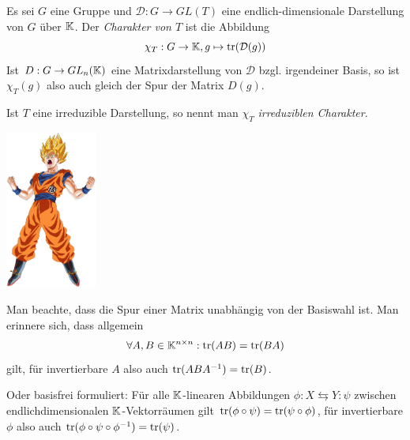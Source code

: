 \begin{minipage}{11cm}
\begin{definition}[Charaktere]
Es sei $G$ eine Gruppe und $\mathcal{D}: G\to GL(T)$ eine endlich-dimensionale Darstellung von $G$ über $\mathbb{K}$. Der \emph{Charakter von $T$} ist die Abbildung
\[\chi_T: G\to \mathbb{K}, g\mapsto \operatorname{tr}(\mathcal{D}(g))\]
Ist $D: G\to GL_n(\mathbb{K})$ eine Matrixdarstellung von $\mathcal{D}$ bzgl. irgendeiner Basis, so ist $\chi_T(g)$ also auch gleich der Spur der Matrix $D(g)$.

Ist $T$ eine irreduzible Darstellung, so nennt man $\chi_T$ \emph{irreduziblen Charakter}.
\end{definition}
\end{minipage}\hfill
\begin{minipage}{3cm}
\setlength{\baselineskip}{7pt}
\includegraphics[width=3cm]{pictures/levelup2.png}
\end{minipage}

\begin{remark}
Man beachte, dass die Spur einer Matrix unabhängig von der Basiswahl ist. Man erinnere sich, dass allgemein
\[\forall A,B\in \mathbb{K}^{n\times n}: \operatorname{tr}(AB) = \operatorname{tr}(BA)\]
gilt, für invertierbare $A$ also auch $\operatorname{tr}(ABA^{-1}) = \operatorname{tr}(B)$.

Oder basisfrei formuliert: Für alle $\mathbb{K}$-linearen Abbildungen $\phi: X \leftrightarrows Y : \psi$ zwischen endlichdimensionalen $\mathbb{K}$-Vektorräumen gilt $\operatorname{tr}(\phi\circ\psi) = \operatorname{tr}(\psi\circ\phi)$, für invertierbare $\phi$ also auch $\operatorname{tr}(\phi\circ\psi\circ\phi^{-1}) = \operatorname{tr}(\psi)$.
\end{remark}

